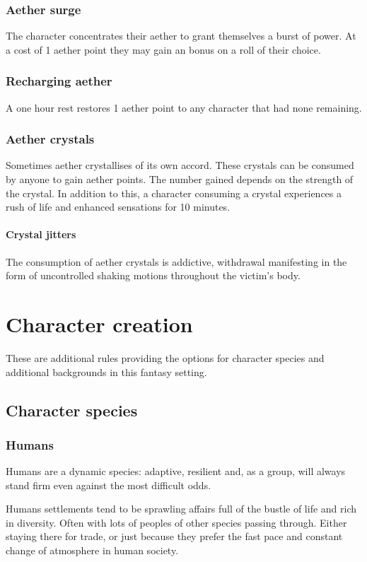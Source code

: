 \documentclass[a4paper,11pt,oneside]{book}
\newcommand{\textlf}[1]{\textbf{\titlecap{#1}}}
\begin{document}
\subsection{Aether surge}
The character concentrates their aether to grant themselves a burst of power. At a cost of 1 aether point they may gain an \textlf{edge} bonus on a roll of their choice.

\subsection{Recharging aether}
A one hour rest restores 1 aether point to any character that had none remaining.

\subsection{Aether crystals}
Sometimes aether crystallises of its own accord. These crystals can be consumed by anyone to gain aether points. The number gained depends on the strength of the crystal. In addition to this, a character consuming a crystal experiences a rush of life and enhanced sensations for 10 minutes.
\subsubsection{Crystal jitters}
The consumption of aether crystals is addictive, withdrawal manifesting in the form of uncontrolled shaking motions throughout the victim's body. 




\chapter{Character creation}
These are additional rules providing the options for character species and additional backgrounds in this fantasy setting.

\section{Character species}

\subsection{Humans}
Humans are a dynamic species: adaptive, resilient and, as a group, will always stand firm even against the most difficult odds.

Humans settlements tend to be sprawling affairs full of the bustle of life and rich in diversity. Often with lots of peoples of other species passing through. Either staying there for trade, or just because they prefer the fast pace and constant change of atmosphere in human society.
\end{document}

